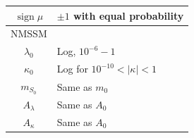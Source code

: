 \documentclass[10pt,aspectratio=169]{beamer}
\DeclareMathOperator{\sign}{sign}
\newcommand{\mzero}{\ensuremath{m_0}\xspace}
\newcommand{\azero}{\ensuremath{A_0}\xspace}
\newcommand{\sgnmu}{\ensuremath{\sign \mu}\xspace}
\begin{document}
\begin{frame}
\begin{columns}[t]
\begin{column}{0.5\textwidth}
\begin{table}
\begin{tabularx}{0.8\textwidth}{cX}
          \sgnmu & $\pm1$ with equal probability\\
          \midrule
          NMSSM\\
          \midrule
          $\lambda_0$ & Log, $10^{-6}-1$\\
          $\kappa_0$ & Log for $10^{-10}< |\kappa| < 1$\\
          $m_{S_0}$ & Same as $\mzero$\\
          $A_\lambda$ & Same as \azero\\
          $A_\kappa$ & Same as \azero\\
          \bottomrule
        \end{tabularx}
      \end{table}
    \end{column}
  \end{columns}
\end{frame}
\end{document}
